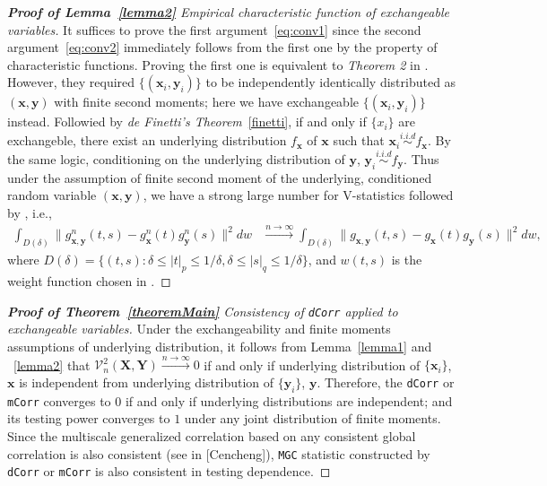 \documentclass[12pt]{article}
\theoremstyle{definition}
\begin{document}
\begin{proof}[\textbf{Proof of Lemma~\ref{lemma2}} Empirical characteristic function of exchangeable variables] 
	
It suffices to prove the first argument~\ref{eq:conv1} since the second argument~\ref{eq:conv2} immediately follows from the first one by the property of characteristic functions.
Proving the first one is equivalent to \textit{Theorem 2} in \cite{szekely2007measuring}. However, they required $\{(\mathbf{x}_{i},\mathbf{y}_{i})\}$ to be independently identically distributed as $(\mathbf{x},\mathbf{y})$ with finite second moments; here we have exchangeable $\{ ( \mathbf{x}_{i}, \mathbf{y}_{i}  ) \}$ instead. Followied by \textit{de Finetti's Theorem}~\ref{finetti}, if and only if $\{ x_{i} \}$ are exchangeble, there exist an underlying distribution $f_{\mathbf{x}}$ of $\mathbf{x}$ such that $\mathbf{x}_{i} \overset{i.i.d}{\sim} f_{\mathbf{x}}$. By the same logic, conditioning on the underlying distribution of $\mathbf{y}$, $\mathbf{y}_{i} \overset{i.i.d}{\sim} f_{\mathbf{y}}$. Thus under the assumption of finite second moment of the underlying, conditioned random variable $(\mathbf{x}, \mathbf{y})$, we have a strong large number for V-statistics followed by \cite{szekely2007measuring}, i.e., 
\begin{eqnarray}
		\displaystyle\int_{D(\delta)}{\|g_{\mathbf{x},\mathbf{y}}^{n}(t,s)-g_{\mathbf{x}}^{n}(t)g_{\mathbf{y}}^{n}(s)\|^{2}}dw &\stackrel{n \rightarrow \infty}{\longrightarrow} \displaystyle\int_{D(\delta)}{\|g_{\mathbf{x},\mathbf{y}}(t,s)-g_{\mathbf{x}}(t)g_{\mathbf{y}}(s)\|^{2}}dw,
\label{eq:SLLN}
\end{eqnarray}
where $D(\delta)=\{(t,s):\delta \leq |t|_{p} \leq 1/\delta,\delta \leq |s|_{q} \leq 1/\delta\}$, and $w(t,s)$ is the weight function chosen in \cite{szekely2007measuring}. 
\end{proof}

\begin{proof}[\textbf{Proof of Theorem~\ref{theoremMain}} Consistency of \texttt{dCorr} applied to exchangeable variables]

Under the exchangeability and finite moments assumptions of underlying distribution, it follows from Lemma~\ref{lemma1} and ~\ref{lemma2} that $\mathcal{V}^{2}_{n}(\mathbf{X},\mathbf{Y}) \xrightarrow{n \rightarrow \infty}  0$ if and only if underlying distribution of $\{\mathbf{x}_{i} \}$, $\mathbf{x}$ is independent from underlying distribution of $\{ \mathbf{y}_{i}  \}$, $\mathbf{y}$. Therefore, the \texttt{dCorr} or \texttt{mCorr} converges to $0$ if and only if  underlying distributions are independent; and its testing power converges to $1$ under any joint distribution of finite moments. Since the multiscale generalized correlation based on any consistent global correlation is also consistent (see in [Cencheng]), \texttt{MGC} statistic constructed by \texttt{dCorr} or \texttt{mCorr} is also consistent in testing dependence.
\end{proof}
\end{document}
